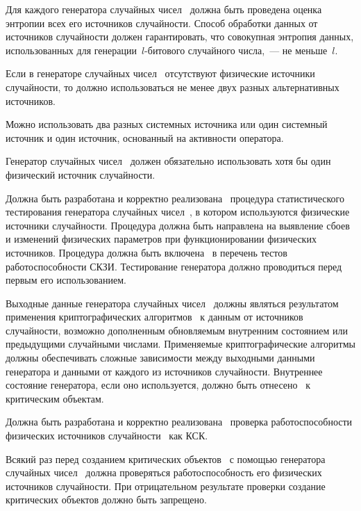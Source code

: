 \label{R.RN.Entropy} %
Для каждого генератора случайных чисел~ должна быть проведена
оценка энтропии всех его источников случайности.
%
Способ обработки данных от источников случайности должен гарантировать, что
совокупная энтропия данных, использованных для 
генерации~$l$-битового случайного числа,~--- не меньше~$l$.

\label{R.RN.Source1} %
Если в генераторе случайных чисел~ отсутствуют физические
источники случайности, то должно использоваться не менее двух разных
альтернативных источников.

\begin{note*}
Можно использовать два разных системных источника или один системный источник и
один источник, основанный на активности оператора.
\end{note*}

\label{R.RN.Source2} %
Генератор случайных чисел~ должен обязательно использовать
хотя бы один физический источник случайности.

\label{R.RN.Tests} %
Должна быть разработана и корректно
реализована~ процедура статистического
тестирования генератора случайных чисел~, в котором
используются физические источники случайности.
%
Процедура должна быть направлена на выявление сбоев и изменений физических
параметров при функционировании физических источников.
%
Процедура должна быть включена~ в перечень тестов 
работоспособности СКЗИ. Тестирование генератора должно проводиться перед 
первым его использованием. 

\label{R.RN.Crypto} %
Выходные данные генератора случайных чисел~
должны являться результатом применения криптографических алгоритмов~ 
к данным от источников случайности, возможно дополненным обновляемым внутренним 
состоянием или предыдущими случайными числами.
%
Применяемые криптографические алгоритмы должны обеспечивать сложные зависимости
между выходными данными генератора и данными от каждого из источников
случайности.
%
Внутреннее состояние генератора, если оно используется, должно быть
отнесено~ к критическим объектам.

\label{R.RN.TotTest} %
Должна быть разработана и корректно
реализована~ проверка работоспособности
физических источников случайности~ как КСК.

\label{R.RN.GenCrit} %
Всякий раз перед созданием критических объектов~ с помощью
генератора случайных чисел~ должна проверяться
работоспособность его физических источников случайности.
%
При отрицательном результате проверки создание критических объектов должно быть
запрещено.
